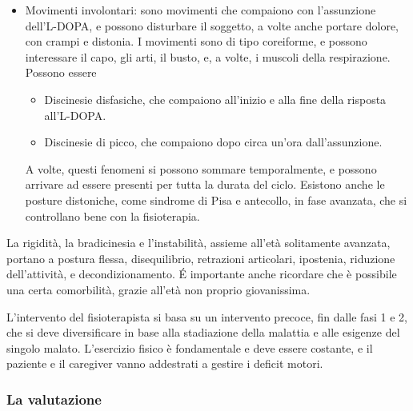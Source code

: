 \begin{itemize}
\begin{itemize}
\begin{itemize}
		essere ritardata, o può non comparire una risposta con una singola dose, o può
		calare la risposta, verso la fine dell'effetto della dose.
		\item Fenomeno ON-OFF: assieme all'OFF motorio, possono comparire problemi
		sensitivi, psichici, cognitivi e autonomici.
		\item Freezing: presente sia in fase ON, che, più frequentemente, in fase OFF.
		\end{itemize}
	\item Movimenti involontari: sono movimenti che compaiono con l'assunzione
	dell'L-DOPA, e possono disturbare il soggetto, a volte anche portare dolore,
	con crampi e distonia. I movimenti sono di tipo coreiforme, e possono
	interessare il capo, gli arti, il busto, e, a volte, i muscoli della
	respirazione. Possono essere
		\begin{itemize}
		\item Discinesie disfasiche, che compaiono all'inizio e alla fine della
		risposta all'L-DOPA.
		\item Discinesie di picco, che compaiono dopo circa un'ora dall'assunzione.
		\end{itemize}
	A volte, questi fenomeni si possono sommare temporalmente, e possono arrivare
	ad essere presenti per tutta la durata del ciclo. Esistono anche le posture
	distoniche, come sindrome di Pisa e antecollo, in fase avanzata, che si
	controllano bene con la fisioterapia.
	\end{itemize}
\end{itemize}

La rigidità, la bradicinesia e l'instabilità, assieme all'età solitamente
avanzata, portano a postura flessa, disequilibrio, retrazioni articolari,
ipostenia, riduzione dell'attività, e decondizionamento. \'E importante anche
ricordare che è possibile una certa comorbilità, grazie all'età non proprio
giovanissima.

L'intervento del fisioterapista si basa su un intervento precoce, fin dalle
fasi 1 e 2, che si deve diversificare in base alla stadiazione della malattia e
alle esigenze del singolo malato. L'esercizio fisico è fondamentale e deve
essere costante, e il paziente e il caregiver vanno addestrati a gestire i
deficit motori.

\subsubsection{La valutazione}


